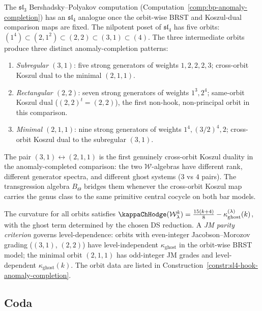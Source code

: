 \begin{remark}
\label{rem:tholog-sl4-extension}
The $\mathfrak{sl}_3$ Bershadsky--Polyakov computation
(Computation~\ref{comp:bp-anomaly-completion}) has an
$\mathfrak{sl}_4$ analogue once the orbit-wise BRST and Koszul-dual
comparison maps are fixed.
The nilpotent poset of $\mathfrak{sl}_4$ has five orbits:
$(1^4)\subset(2,1^2)\subset(2,2)\subset(3,1)\subset(4)$.
The three intermediate orbits produce three distinct anomaly-completion
patterns:
\begin{enumerate}[label=\textup{(\roman*)}]
\item \emph{Subregular $(3,1)$}: five strong generators of weights
 $1,2,2,2,3$; cross-orbit Koszul dual to the minimal $(2,1,1)$.
\item \emph{Rectangular $(2,2)$}: seven strong generators of
 weights $1^3,2^4$; same-orbit Koszul dual ($(2,2)^t=(2,2)$),
 the first non-hook, non-principal orbit in this comparison.
\item \emph{Minimal $(2,1,1)$}: nine strong generators of
 weights $1^4,(3/2)^4,2$; cross-orbit Koszul dual to the
 subregular $(3,1)$.
\end{enumerate}
The pair $(3,1)\leftrightarrow(2,1,1)$ is the first genuinely
cross-orbit Koszul duality in the anomaly-completed comparison:
the two $\mathcal W$-algebras have different rank, different
generator spectra, and different ghost systems ($3$ vs $4$ pairs).
The transgression algebra $B_\Theta$ bridges them whenever the
cross-orbit Koszul map carries the genus class to the same primitive
central cocycle on both bar models.

The curvature for all orbits satisfies
$\kappaChHodge(\mathcal W_\lambda^k)=\frac{15(k+4)}{8}
-\kappa_{\mathrm{ghost}}^{(\lambda)}(k)$,
with the ghost term determined by the chosen DS reduction.
A \emph{JM parity criterion} governs level-dependence:
orbits with even-integer Jacobson--Morozov grading ($(3,1)$, $(2,2)$)
have level-independent $\kappa_{\mathrm{ghost}}$ in the orbit-wise
BRST model; the minimal orbit $(2,1,1)$ has odd-integer JM grades and
level-dependent
$\kappa_{\mathrm{ghost}}(k)$.
The orbit data are listed in
Construction~\ref{constr:sl4-hook-anomaly-completion}.
\end{remark}

\subsection{Coda}
\label{subsec:tholog-coda}

